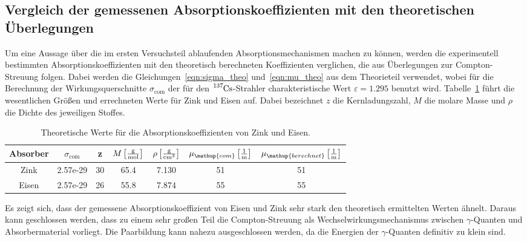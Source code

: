 \documentclass[
  bibliography=totoc,     %
  captions=tableheading,  %
  titlepage=firstiscover, %
]{scrartcl}
\begin{document}
\subsection{Vergleich der gemessenen Absorptionskoeffizienten mit den theoretischen Überlegungen}

Um eine Aussage über die im ersten Versuchsteil ablaufenden Absorptionsmechanismen
machen zu können, werden die experimentell bestimmten Absorptionskoeffizienten
mit den theoretisch berechneten Koeffizienten verglichen, die aus Überlegungen
zur Compton-Streuung folgen. Dabei werden die Gleichungen~\eqref{eqn:sigma_theo}
und~\eqref{eqn:mu_theo} aus dem Theorieteil verwendet, wobei für die Berechnung
der Wirkungsquerschnitte $\sigma_{\mathup{com}}$ der für den
$\ce{^{137}Cs}$-Strahler charakteristische Wert $\varepsilon = \num{1.295}$
benutzt wird. Tabelle~\ref{tab:theoriewerte} führt die wesentlichen Größen und
errechneten Werte für Zink und Eisen auf. Dabei bezeichnet $z$ die
Kernladungszahl, $M$ die molare Masse und $\rho$ die Dichte des jeweiligen
Stoffes.

\begin{table}[ht]
	\begin{center}
        \caption{Theoretische Werte für die Absorptionskoeffizienten von Zink und Eisen.}
        \label{tab:theoriewerte}
		\begin{tabular}{ccccccc}
			\toprule
			{Absorber} & {$\sigma_{\mathup{com}}$} & {z} & {$M\left[\si{\frac{\gram}{\mol}}\right]$} &
            {$\rho\left[\si{\frac{\gram}{\centi\metre\cubed}}\right]$} &
            {$\mu_{\mathup{com}}\left[\si{\frac{1}{\metre}}\right]$} &
            {$\mu_{\mathup{berechnet}}\left[\si{\frac{1}{\metre}}\right]$} \\
			\midrule
			Zink  & 2.57e-29 & 30 &  65.4 &  7.130 & 51 & 51\\
			Eisen & 2.57e-29 & 26 &  55.8 &  7.874 & 55 & 55\\
			\bottomrule
		\end{tabular}
	\end{center}
\end{table}

Es zeigt sich, dass der gemessene Absorptionskoeffizient von Eisen und Zink sehr
stark den theoretisch ermittelten Werten ähnelt. Daraus kann
geschlossen werden, dass zu einem sehr großen Teil die Compton-Streuung als
Wechselwirkungsmechanismus zwischen $\gamma$-Quanten und Absorbermaterial
vorliegt. Die Paarbildung kann nahezu ausgeschlossen werden, da die Energien der $\gamma$-Quanten definitiv zu klein sind.
\end{document}
